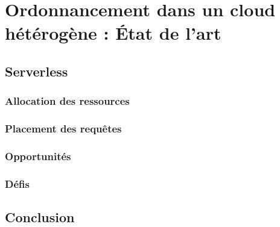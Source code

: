 \chapter{Ordonnancement dans un cloud hétérogène : État de l'art}

\section{Serverless}

\subsection{Allocation des ressources}

\subsection{Placement des requêtes}

\subsection{Opportunités}

\subsection{Défis}

\section{Conclusion}

